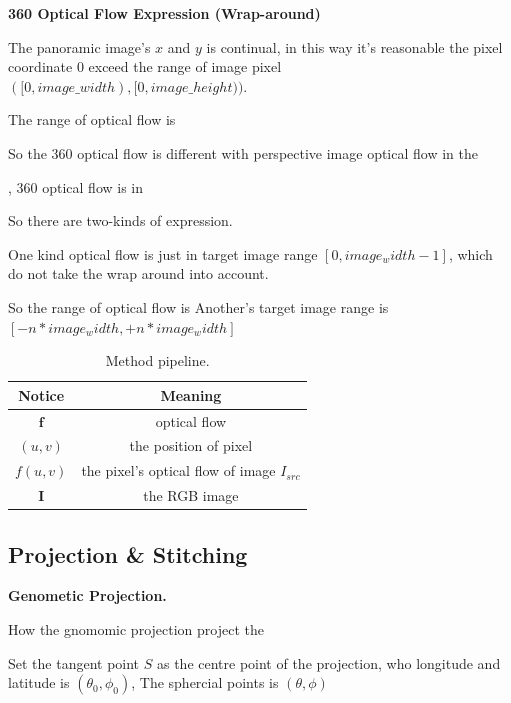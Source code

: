 \textbf{360 Optical Flow Expression (Wrap-around)}

The panoramic image's $x$ and $y$ is continual, in this way it's reasonable the pixel coordinate 0 exceed the range of image pixel $([0, image\_width), [0, image\_height))$. 

The range of optical flow is 

So the 360 optical flow is different with perspective image optical flow in the 

, 360 optical flow is  in 

So there are two-kinds of expression.

One kind optical flow is just in target image range $[0, image_width - 1]$, which do not take the wrap around into account.

So the range of optical flow is 
Another's target image range is $[- n * image_width, + n * image_width]$


\begin{table}
	\begin{center}
		\begin{tabular}{ c | c } 
			\hline
			Notice & Meaning  \\ [0.5ex] 
			\hline\hline
			$\textbf{f}$ & optical flow  \\ 
			\hline
			$(u,v)$ & the position of pixel   \\
			\hline
			$f(u,v)$ & the pixel's optical flow of image $I_{src}$ \\
			\hline
			$\textbf{I}$ & the RGB image  \\ [1ex] 
			\hline
		\end{tabular}
	\end{center}
	\caption{Method pipeline. }
	\label{tab:approach:notation}
\end{table}

\subsection{Projection \& Stitching}

\textbf{Genometic Projection.}

How the gnomomic projection project the 

Set the tangent point $S$ as the centre point of the projection, who longitude and latitude is $(\theta_0, \phi_0)$,
The sphercial points is $(\theta, \phi)$

